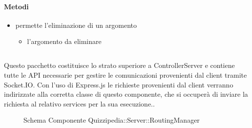 \paragraph{Metodi}
\begin{itemize}
\item {}
\newline
permette l'eliminazione di un argomento
\newline
{}
\newline
\begin{itemize}
\item {}
\newline
l'argomento da eliminare
\end{itemize}
\end{itemize}
\subsection{}
Questo pacchetto costituisce lo strato superiore a ControllerServer e contiene tutte le API necessarie per gestire le comunicazioni provenienti dal client tramite Socket.IO. 
Con l'uso di Express.js le richieste provenienti dal client verranno indirizzate alla corretta classe di questo componente, che si occuperà di inviare la richiesta al relativo services per la sua esecuzione..
\begin{figure}[H]
\centering
\noindent{}
\caption[Schema Componente Quizzipedia::Server::RoutingManager]{Schema Componente Quizzipedia::Server::RoutingManager}
\end{figure}
